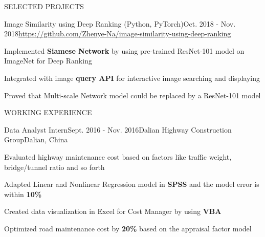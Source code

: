 \documentclass{resume} %
\begin{document}
\begin{rSection}{SELECTED PROJECTS}

\begin{rSubsection}{Image Similarity using Deep Ranking (Python, PyTorch)}{Oct. 2018 - Nov. 2018}{\url{https://github.com/Zhenye-Na/image-similarity-using-deep-ranking}}{}
\item Implemented \textbf{Siamese Network} by using pre-trained ResNet-101 model on ImageNet for Deep Ranking
\item Integrated with image \textbf{query API} for interactive image searching and displaying
\item Proved that Multi-scale Network model could be replaced by a ResNet-101 model
\end{rSubsection}



\end{rSection} 

\begin{rSection}{WORKING EXPERIENCE} \itemsep -3pt  


\begin{rSubsection}{Data Analyst Intern}{Sept. 2016 - Nov. 2016}{Dalian Highway Construction Group}{Dalian, China}
\item Evaluated highway maintenance cost based on factors like traffic weight, bridge/tunnel ratio and so forth
\item Adapted Linear and Nonlinear Regression model in \textbf{SPSS} and the model error is within \textbf{10\%}
\item Created data visualization in Excel for Cost Manager by using \textbf{VBA}
\item Optimized road maintenance cost by \textbf{20\%} based on the appraisal factor model
\end{rSubsection} 

\end{rSection} 



\end{document}
